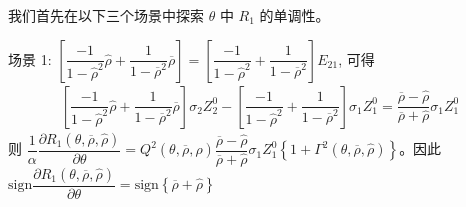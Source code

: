 \documentclass[10.0pt]{article}
\begin{document}
我们首先在以下三个场景中探索 {\footnotesize $ \theta $} 中 {\footnotesize $ R_1 $} 的单调性。

场景 1: {\footnotesize $ \left[ \dfrac{- 1}{1 - {\hat \rho}^2} {\hat \rho} + \dfrac1{1 - \overline{\rho}^2} \overline{\rho} \right] = \left[ \dfrac{- 1}{1 - {\hat \rho}^2} + \dfrac1{1 - \overline{\rho}^2} \right] E_{2 1} $}, 可得
{\footnotesize \begin{eqnarray*}
\left[ \dfrac{- 1}{1 - {\hat \rho}^2} {\hat \rho} + \dfrac1{1 - \overline{\rho}^2} \overline{\rho} \right] \sigma_2 Z_2^0 - \left[ \dfrac{- 1}{1 - {\hat \rho}^2} + \dfrac1{1 - \overline{\rho}^2} \right] \sigma_1 Z_1^0 = \dfrac{\overline{\rho} - {\hat \rho}}{\overline{\rho} + {\hat \rho}} \sigma_1 Z_1^0
\end{eqnarray*}}
则 {\footnotesize $ \dfrac{1}{\alpha} \dfrac{\partial R_1 (\theta, \overline{\rho}, {\hat \rho})}{\partial \theta} = Q^2 (\theta, \overline{\rho}, {\hat \rho}) \dfrac{\overline{\rho} - {\hat \rho}}{\overline{\rho} + {\hat \rho}} \sigma_1 Z_1^0 \left\{ 1 + \Gamma^2 (\theta, \overline{\rho}, {\hat \rho}) \right\} $}。因此 {\footnotesize $ \text{sign} \dfrac{\partial R_1 (\theta, \overline{\rho}, {\hat \rho})}{\partial \theta} = \text{sign} \left\{ \overline{\rho} + {\hat \rho} \right\} $}
\end{document}
